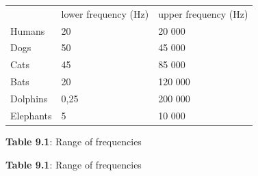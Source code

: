           \begin{table}[H]
        \begin{center}
      \label{m38799*uid3}
    \noindent
      \tablelasttail{}
      \begin{xtabular}[t]{|l|l|l|}\hline
         &
        lower frequency (Hz) &
        upper frequency (Hz)%
     \tabularnewline{}
        Humans &
        20 &
        20 000%
     \tabularnewline{}
        Dogs &
        50 &
        45 000%
     \tabularnewline{}
        Cats &
        45 &
        85 000%
     \tabularnewline{}
        Bats &
        20 &
        120 000%
     \tabularnewline{}
        Dolphins &
        0,25 &
        200 000%
     \tabularnewline{}
        Elephants &
        5 &
        10 000%
     \tabularnewline{}
    \end{xtabular}
      \end{center}
    \begin{center}{\small\bfseries Table 9.1}: Range of frequencies\end{center}
    \begin{caption}{\small\bfseries Table 9.1}: Range of frequencies\end{caption}
\end{table}
    \par
\label{m38799*secfhsst!!!underscore!!!id143}
